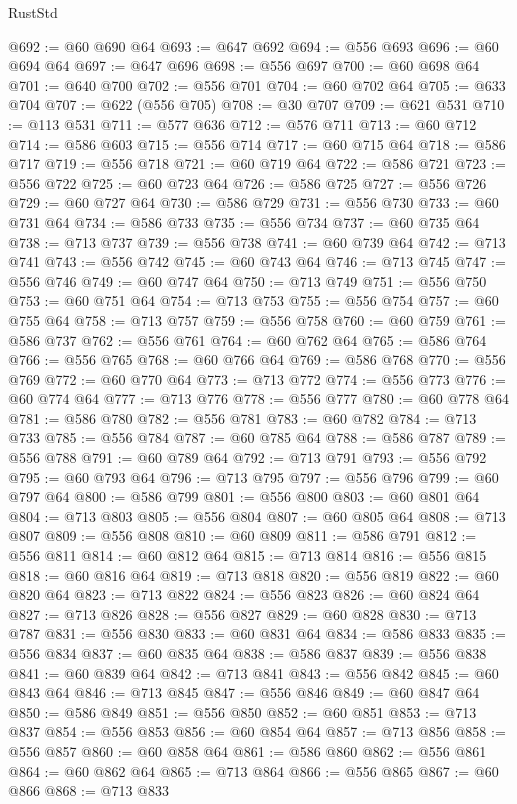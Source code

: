 \begin{lexlean}{RustStd}
\begin{coremodule}
{\begin{coremodule}
{{{{{{{{{{{{{{{{{{{{{{{{{{{{{@692 := @60 @690 @64
@693 := @647 @692
@694 := @556 @693
@696 := @60 @694 @64
@697 := @647 @696
@698 := @556 @697
@700 := @60 @698 @64
@701 := @640 @700
@702 := @556 @701
@704 := @60 @702 @64
@705 := @633 @704
@707 := @622 (@556 @705)
@708 := @30 @707
@709 := @621 @531
@710 := @113 @531
@711 := @577 @636
@712 := @576 @711
@713 := @60 @712
@714 := @586 @603
@715 := @556 @714
@717 := @60 @715 @64
@718 := @586 @717
@719 := @556 @718
@721 := @60 @719 @64
@722 := @586 @721
@723 := @556 @722
@725 := @60 @723 @64
@726 := @586 @725
@727 := @556 @726
@729 := @60 @727 @64
@730 := @586 @729
@731 := @556 @730
@733 := @60 @731 @64
@734 := @586 @733
@735 := @556 @734
@737 := @60 @735 @64
@738 := @713 @737
@739 := @556 @738
@741 := @60 @739 @64
@742 := @713 @741
@743 := @556 @742
@745 := @60 @743 @64
@746 := @713 @745
@747 := @556 @746
@749 := @60 @747 @64
@750 := @713 @749
@751 := @556 @750
@753 := @60 @751 @64
@754 := @713 @753
@755 := @556 @754
@757 := @60 @755 @64
@758 := @713 @757
@759 := @556 @758
@760 := @60 @759
@761 := @586 @737
@762 := @556 @761
@764 := @60 @762 @64
@765 := @586 @764
@766 := @556 @765
@768 := @60 @766 @64
@769 := @586 @768
@770 := @556 @769
@772 := @60 @770 @64
@773 := @713 @772
@774 := @556 @773
@776 := @60 @774 @64
@777 := @713 @776
@778 := @556 @777
@780 := @60 @778 @64
@781 := @586 @780
@782 := @556 @781
@783 := @60 @782
@784 := @713 @733
@785 := @556 @784
@787 := @60 @785 @64
@788 := @586 @787
@789 := @556 @788
@791 := @60 @789 @64
@792 := @713 @791
@793 := @556 @792
@795 := @60 @793 @64
@796 := @713 @795
@797 := @556 @796
@799 := @60 @797 @64
@800 := @586 @799
@801 := @556 @800
@803 := @60 @801 @64
@804 := @713 @803
@805 := @556 @804
@807 := @60 @805 @64
@808 := @713 @807
@809 := @556 @808
@810 := @60 @809
@811 := @586 @791
@812 := @556 @811
@814 := @60 @812 @64
@815 := @713 @814
@816 := @556 @815
@818 := @60 @816 @64
@819 := @713 @818
@820 := @556 @819
@822 := @60 @820 @64
@823 := @713 @822
@824 := @556 @823
@826 := @60 @824 @64
@827 := @713 @826
@828 := @556 @827
@829 := @60 @828
@830 := @713 @787
@831 := @556 @830
@833 := @60 @831 @64
@834 := @586 @833
@835 := @556 @834
@837 := @60 @835 @64
@838 := @586 @837
@839 := @556 @838
@841 := @60 @839 @64
@842 := @713 @841
@843 := @556 @842
@845 := @60 @843 @64
@846 := @713 @845
@847 := @556 @846
@849 := @60 @847 @64
@850 := @586 @849
@851 := @556 @850
@852 := @60 @851
@853 := @713 @837
@854 := @556 @853
@856 := @60 @854 @64
@857 := @713 @856
@858 := @556 @857
@860 := @60 @858 @64
@861 := @586 @860
@862 := @556 @861
@864 := @60 @862 @64
@865 := @713 @864
@866 := @556 @865
@867 := @60 @866
@868 := @713 @833
}}}}}}}}}}}}}}}}}}}}}}}}}}}}}
\end{coremodule}}
\end{coremodule}
\end{lexlean}
